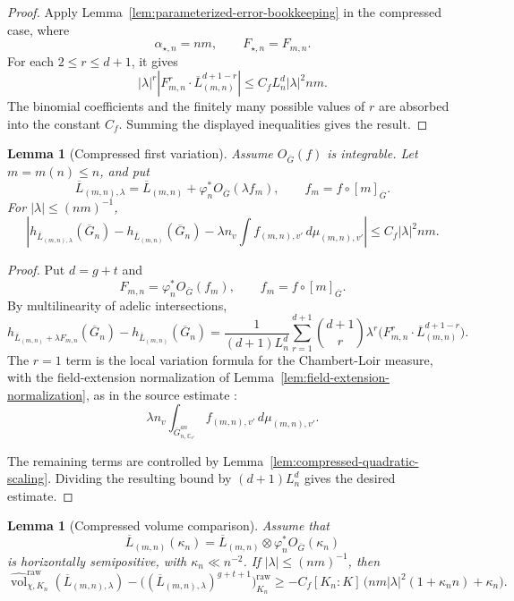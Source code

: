 \documentclass[10pt,a4paper]{amsart}
\theoremstyle{plain}
\newtheorem{lemma}[theorem]{Lemma}
\theoremstyle{plain}
\numberwithin{equation}{section}
\providecommand{\ol}{\overline}
\begin{document}
\begin{proof}
	Apply Lemma~\ref{lem:parameterized-error-bookkeeping} in the compressed case,
	where
	\[
	\alpha_{\star,n}=nm,\qquad
	F_{\star,n}=F_{m,n}.
	\]
	For each \(2\le r\le d+1\), it gives
	\[
	|\lambda|^r
	\left|
	F_{m,n}^r\cdot\ol L_{(m,n)}^{d+1-r}
	\right|
	\le
	C_f L_n^d|\lambda|^2nm .
	\]
	The binomial coefficients and the finitely many possible values of \(r\) are
	absorbed into the constant \(C_f\).  Summing the displayed inequalities gives
	the result.
\end{proof}

\begin{lemma}[Compressed first variation]
	\label{lem:compressed-height-variation}
	Assume \(O_{\ol G}(f)\) is integrable.  Let \(m=m(n)\le n\), and put
	\[
	\ol L_{(m,n),\lambda}
	=
	\ol L_{(m,n)}+\varphi_n^*O_{\ol G}(\lambda f_m),
	\qquad
	f_m=f\circ[m]_{\ol G}.
	\]
	For \(|\lambda|\le (nm)^{-1}\),
	\[
	\left|
	h_{\ol L_{(m,n),\lambda}}(\ol G_n)
	-h_{\ol L_{(m,n)}}(\ol G_n)
	-\lambda n_v
	\int f_{(m,n),v'}\,d\mu_{(m,n),v'}
	\right|
	\le C_f|\lambda|^2nm.
	\]
\end{lemma}

\begin{proof}
	Put \(d=g+t\) and
	\[
	F_{m,n}=\varphi_n^*O_{\ol G}(f_m),
	\qquad f_m=f\circ[m]_{\ol G}.
	\]
	By multilinearity of adelic intersections,
	\[
	h_{\ol L_{(m,n)}+\lambda F_{m,n}}(\ol G_n)
	-h_{\ol L_{(m,n)}}(\ol G_n)
	=
	\frac{1}{(d+1)L_n^d}
	\sum_{r=1}^{d+1}
	\binom{d+1}{r}\lambda^r
	\bigl(F_{m,n}^r\cdot\ol L_{(m,n)}^{d+1-r}\bigr).
	\]
	The \(r=1\) term is the local variation formula for the Chambert-Loir measure,
	with the field-extension normalization of
	Lemma~\ref{lem:field-extension-normalization}, as in the source estimate
	\cite[Lemma~4.4]{Ku1}:
	\[
	\lambda n_v
	\int_{\ol G_{n,\mathbb{C}_{v'}}^{an}}
	f_{(m,n),v'}\,d\mu_{(m,n),v'}.
	\]
	
	The remaining terms are controlled by
	Lemma~\ref{lem:compressed-quadratic-scaling}.  Dividing the resulting bound by
	\((d+1)L_n^d\) gives the desired estimate.
\end{proof}

\begin{lemma}[Compressed volume comparison]
	\label{lem:compressed-volume}
	Assume that
	\[
	\ol L_{(m,n)}(\kappa_n)
	=\ol L_{(m,n)}\otimes\varphi_n^*O_{\ol G}(\kappa_n)
	\]
	is horizontally semipositive, with \(\kappa_n\ll n^{-2}\).  If
	\(|\lambda|\le (nm)^{-1}\), then
	\[
	\widehat{\operatorname{vol}}_{\chi,K_n}^{\mathrm{raw}}(\ol L_{(m,n),\lambda})
	-\bigl((\ol L_{(m,n),\lambda})^{g+t+1}\bigr)^{\mathrm{raw}}_{K_n}
	\ge
	-C_f [K_n:K]\,
	\bigl(nm|\lambda|^2(1+\kappa_n n)+\kappa_n\bigr).
	\]
\end{lemma}
\end{document}
